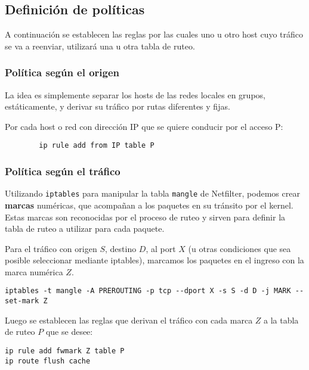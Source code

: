 \subsection{Definición de políticas}
A continuación se establecen las reglas por las cuales uno u otro host cuyo tráfico se va a reenviar, utilizará una u otra tabla de ruteo. 

\subsubsection{Política según el origen}
La idea es simplemente separar los hosts de las redes locales en grupos, estáticamente, y derivar su tráfico por rutas diferentes y fijas. 

Por cada host o red con dirección IP que se quiere conducir por el acceso P:
\begin{lstlisting}
		ip rule add from IP table P 
\end{lstlisting}

\subsubsection{Política según el tráfico}

Utilizando \texttt{iptables} para manipular la tabla \texttt{mangle} de Netfilter, podemos crear \textbf{marcas} numéricas, que acompañan a los paquetes en su tránsito por el kernel. Estas marcas son reconocidas por el proceso de ruteo y sirven para definir la tabla de ruteo a utilizar para cada paquete.

Para el tráfico con origen $S$, destino $D$, al port $X$ (u otras condiciones que sea posible seleccionar mediante iptables), marcamos los paquetes en el ingreso con la marca numérica $Z$.
\begin{lstlisting}
iptables -t mangle -A PREROUTING -p tcp --dport X -s S -d D -j MARK --set-mark Z
\end{lstlisting}

Luego se establecen las reglas que derivan el tráfico con cada marca $Z$ a la tabla de ruteo $P$ que se desee:
\begin{lstlisting}
ip rule add fwmark Z table P
ip route flush cache
\end{lstlisting}

% 
% 

